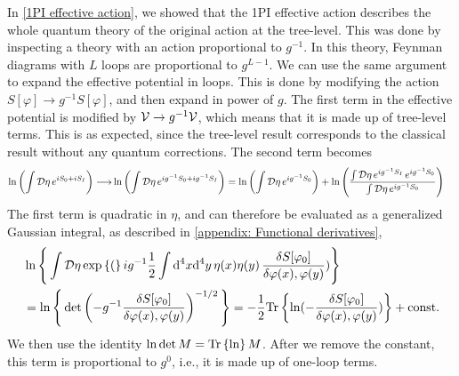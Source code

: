 In \autoref{1PI effective action}, we showed that the 1PI effective action describes the whole quantum theory of the original action at the tree-level.
This was done by inspecting a theory with an action proportional to $g^{-1}$.
In this theory, Feynman diagrams with $L$ loops are proportional to $g^{L-1}$.
We can use the same argument to expand the effective potential in loops.
This is done by modifying the action $S[\varphi] \rightarrow g^{-1}S[\varphi]$, and then expand in power of $g$.
The first term in the effective potential is modified by $\mathcal{V} \rightarrow g^{-1}\mathcal{V}$, which means that it is made up of tree-level terms.
This is as expected, since the tree-level result corresponds to the classical result without any quantum corrections.
The second term becomes
%
\begin{align*}
    \ln
    \left(
        \int \mathcal D \eta \, e^{i S_0 + i S_I}
    \right)
    \longrightarrow
    &
    \ln
    \left(
        \int \mathcal D \eta \, e^{i g^{-1}S_0 + i g^{-1} S_I}
    \right)
    = 
    \ln\left(
        \int \mathcal D \eta \, e^{i g^{-1}S_0}
    \right)
    +
    \ln
    \left(
        \frac{
            \int \mathcal D \eta\, e^{i g^{-1} S_I} \, e^{i g^{-1}S_0}
        }{
            \int \mathcal D \eta\,e^{i g^{-1}S_0}
        }
    \right)
\end{align*}
%
The first term is quadratic in $\eta$, and can therefore be evaluated as a generalized Gaussian integral, as described in \autoref{appendix: Functional derivatives},
%
\begin{align*}
    & 
    \ln\Bigg\{
        \int \D \eta \, 
    \exp(
            i g^{-1} \frac{1}{2} \int \dd^4x \dd^4y\,  \eta(x) \eta(y) \, 
            \fdv{S[\varphi_0]}{\varphi(x),\varphi(y)} 
        )
    \Bigg\}
    \\
    & 
    = 
    \ln\Bigg\{
        \det\left( - g^{-1} \fdv{S[\varphi_0]}{\varphi(x), \varphi(y)} \right)^{-1/2}
    \Bigg\}
    = -\frac{1}{2}
    \Tr{
        \ln(
        - \fdv{S[\varphi_0]}{\varphi(x), \varphi(y)}
        )
    }
    + \const
\end{align*}
%
We then use the identity $\ln \det M = \text{Tr} \left\{ \ln \right\} M$.
After we remove the constant, this term is proportional to $g^0$, i.e., it is made up of one-loop terms.

